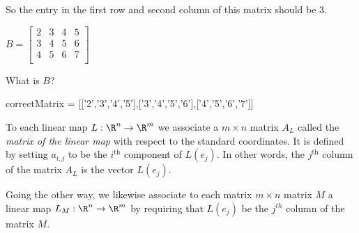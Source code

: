 \documentclass{ximera}
\begin{document}
\begin{question}
\begin{solution}
\begin{hint}
   		So the entry in the first row and second column of this matrix should be  $3$.
   \end{hint}
    \begin{hint}
    	$B = \begin{bmatrix}
    		2 &3 & 4&5\\
    		3&4&5&6\\
    		4&5&6&7\\
    	\end{bmatrix}$
    \end{hint}
    What is $B$?
	
    \begin{matrix-answer}[name=B]
      correctMatrix = [['2','3','4','5'],['3','4','5','6'],['4','5','6','7']]
    \end{matrix-answer}
  \end{solution}
\end{question}

\begin{definition}
  To each linear map $L: \R^n \to \R^m$ we associate a $m \times n$
  matrix $A_L$ called the \textit{matrix of the linear map} with
  respect to the standard coordinates.  It is defined by setting
  $a_{i,j}$ to be the $i^{\text{th}}$ component of $L(e_j)$.  In other words,
  the $j^{\text{th}}$ column of the matrix $A_L$ is the vector $L(e_j)$.

  Going the other way, we likewise associate to each matrix $m \times
  n$ matrix $M$ a linear map $L_M: \R^n \to \R^m$ by requiring that
  $L(e_j)$ be the $j^{th}$ column of the matrix $M$.
\end{definition}
\end{document}
